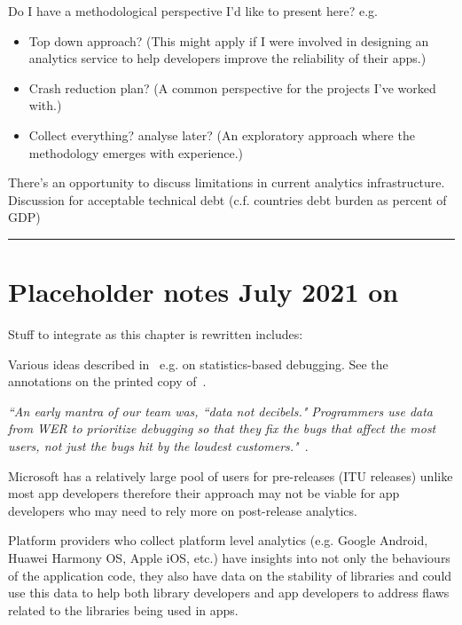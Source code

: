 Do I have a methodological perspective I'd like to present here?
e.g.
\begin{itemize}
    \item Top down approach? (This might apply if I were involved in designing an analytics service to help developers improve the reliability of their apps.)
    \item Crash reduction plan? (A common perspective for the projects I've worked with.) 
    \item Collect everything? analyse later? (An exploratory approach where the methodology emerges with experience.)
\end{itemize}


There's an opportunity to discuss limitations in current analytics infrastructure. Discussion for acceptable technical debt (c.f. countries debt burden as percent of GDP)


\par\noindent\rule{\textwidth}{0.4pt}
\section{Placeholder notes  July 2021 on}
Stuff to integrate as this chapter is rewritten includes:

Various ideas described in~\cite{kinshuman2009_debugging_in_the_very_large, kinshuman2011_debugging_in_the_very_large} e.g. on statistics-based debugging. See the annotations on the printed copy of~\citep{kinshuman2011_debugging_in_the_very_large}. 

\emph{``An early mantra of our team was, ``data not decibels." Programmers use data from WER to prioritize debugging so that they fix the bugs that affect the most users, not just the bugs hit by
the loudest customers."}~\citep{kinshuman2009_debugging_in_the_very_large}. 

Microsoft has a relatively large pool of users for pre-releases (ITU releases) unlike most app developers therefore their approach may not be viable for app developers who may need to rely more on post-release analytics.

Platform providers who collect platform level analytics (e.g. Google Android, Huawei Harmony OS, Apple iOS, etc.) have insights into not only the behaviours of the application code, they also have data on the stability of libraries and could use this data to help both library developers and app developers to address flaws related to the libraries being used in apps.

